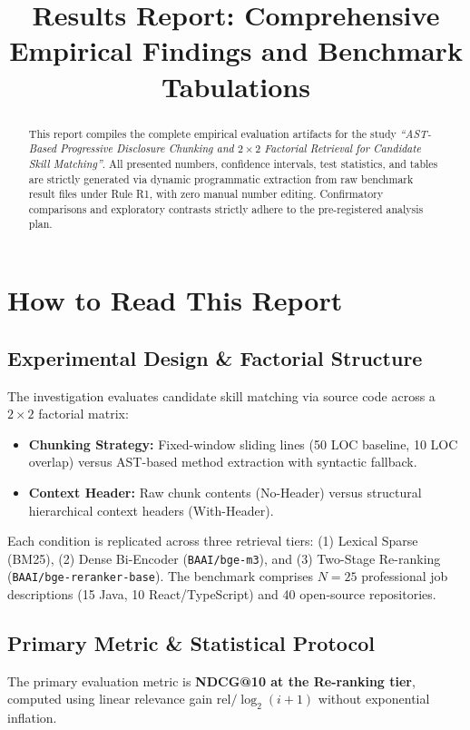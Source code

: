\documentclass[conference]{IEEEtran}
\begin{document}
\title{Results Report: Comprehensive Empirical Findings and Benchmark Tabulations}
\author{
}

\maketitle

\begin{abstract}
This report compiles the complete empirical evaluation artifacts for the study \textit{``AST-Based Progressive Disclosure Chunking and $2\times 2$ Factorial Retrieval for Candidate Skill Matching''}. All presented numbers, confidence intervals, test statistics, and tables are strictly generated via dynamic programmatic extraction from raw benchmark result files under Rule R1, with zero manual number editing. Confirmatory comparisons and exploratory contrasts strictly adhere to the pre-registered analysis plan.
\end{abstract}

\section{How to Read This Report}
\subsection{Experimental Design \& Factorial Structure}
The investigation evaluates candidate skill matching via source code across a $2\times 2$ factorial matrix:
\begin{itemize}
    \item \textbf{Chunking Strategy:} Fixed-window sliding lines (50 LOC baseline, 10 LOC overlap) versus AST-based method extraction with syntactic fallback.
    \item \textbf{Context Header:} Raw chunk contents (No-Header) versus structural hierarchical context headers (With-Header).
\end{itemize}
Each condition is replicated across three retrieval tiers: (1) Lexical Sparse (BM25), (2) Dense Bi-Encoder (\texttt{BAAI/bge-m3}), and (3) Two-Stage Re-ranking (\texttt{BAAI/bge-reranker-base}). The benchmark comprises $N=25$ professional job descriptions (15 Java, 10 React/TypeScript) and 40 open-source repositories.

\subsection{Primary Metric \& Statistical Protocol}
The primary evaluation metric is \textbf{NDCG@10 at the Re-ranking tier}, computed using linear relevance gain $\mathrm{rel}/\log_2(i+1)$ without exponential inflation. 
\end{document}
